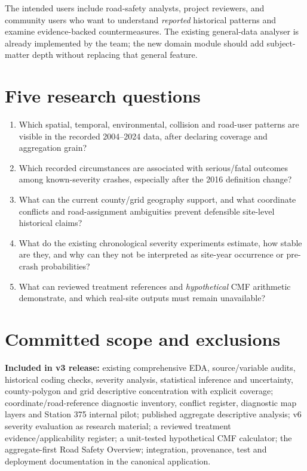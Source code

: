 \documentclass[11pt,a4paper,openany]{report}
\begin{document}
The intended users include road-safety analysts, project reviewers, and community users who want to understand \emph{reported} historical patterns and examine evidence-backed countermeasures. The existing general-data analyser is already implemented by the team; the new domain module should add subject-matter depth without replacing that general feature.

\section{Five research questions}
\begin{enumerate}
\item Which spatial, temporal, environmental, collision and road-user patterns are visible in the recorded 2004--2024 data, after declaring coverage and aggregation grain?
\item Which recorded circumstances are associated with serious/fatal outcomes among known-severity crashes, especially after the 2016 definition change?
\item What can the current county/grid geography support, and what coordinate conflicts and road-assignment ambiguities prevent defensible site-level historical claims?
\item What do the existing chronological severity experiments estimate, how stable are they, and why can they not be interpreted as site-year occurrence or pre-crash probabilities?
\item What can reviewed treatment references and \emph{hypothetical} CMF arithmetic demonstrate, and which real-site outputs must remain unavailable?
\end{enumerate}

\section{Committed scope and exclusions}
\textbf{Included in v3 release:} existing comprehensive EDA, source/variable audits, historical coding checks, severity analysis, statistical inference and uncertainty, county-polygon and grid descriptive concentration with explicit coverage; coordinate/road-reference diagnostic inventory, conflict register, diagnostic map layers and Station 375 internal pilot; published aggregate descriptive analysis; v6 severity evaluation as research material; a reviewed treatment evidence/applicability register; a unit-tested hypothetical CMF calculator; the aggregate-first Road Safety Overview; integration, provenance, test and deployment documentation in the canonical application.
\end{document}
